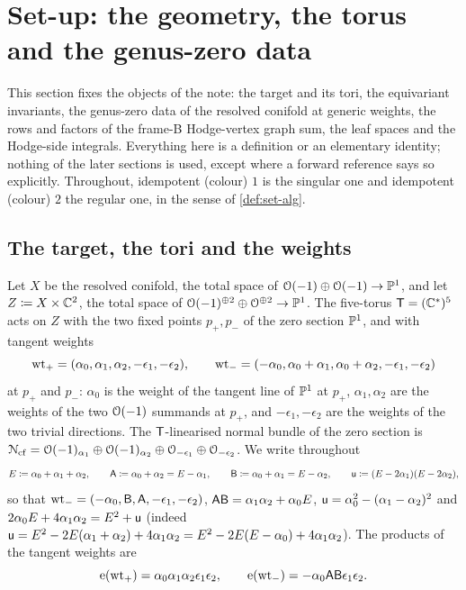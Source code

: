 \providecommand{\pc}{\mathsf{p}}            %
\section{Set-up: the geometry, the torus and the genus-zero data}
\label{sec:set}

This section fixes the objects of the note: the target and its tori, the equivariant invariants, the genus-zero data of the resolved conifold at generic weights, the rows and factors of the frame-B Hodge-vertex graph sum, the leaf spaces and the Hodge-side integrals. Everything here is a definition or an elementary identity; nothing of the later sections is used, except where a forward reference says so explicitly. Throughout, idempotent (colour) $1$ is the singular one and idempotent (colour) $2$ the regular one, in the sense of \cref{def:set-alg}.

\subsection{The target, the tori and the weights}
\label{sec:set-target}

Let $X$ be the resolved conifold, the total space of $\mathcal{O}(-1)\oplus\mathcal{O}(-1)\to\mathbb{P}^1$, and let $Z\coloneqq X\times\mathbb{C}^2$, the total space of $\mathcal{O}(-1)^{\oplus2}\oplus\mathcal{O}^{\oplus2}\to\mathbb{P}^1$. The five-torus $\mathsf{T}=(\mathbb{C}^*)^5$ acts on $Z$ with the two fixed points $p_+,p_-$ of the zero section $\mathbb{P}^1$, and with tangent weights
\begin{equation}
\label{eq:set-wts}
\mathrm{wt}_+=(\alpha_0,\alpha_1,\alpha_2,-\epsilon_1,-\epsilon_2),\qquad
\mathrm{wt}_-=(-\alpha_0,\alpha_0+\alpha_1,\alpha_0+\alpha_2,-\epsilon_1,-\epsilon_2)
\end{equation}
at $p_+$ and $p_-$: $\alpha_0$ is the weight of the tangent line of $\mathbb{P}^1$ at $p_+$, $\alpha_1,\alpha_2$ are the weights of the two $\mathcal{O}(-1)$ summands at $p_+$, and $-\epsilon_1,-\epsilon_2$ are the weights of the two trivial directions. The $\mathsf{T}$-linearised normal bundle of the zero section is $\mathcal{N}_{\mathrm{cf}}=\mathcal{O}(-1)_{\alpha_1}\oplus\mathcal{O}(-1)_{\alpha_2}\oplus\mathcal{O}_{-\epsilon_1}\oplus\mathcal{O}_{-\epsilon_2}$.  We write throughout
\[
E\coloneqq\alpha_0+\alpha_1+\alpha_2,\qquad \mathsf{A}\coloneqq\alpha_0+\alpha_2=E-\alpha_1,\qquad \mathsf{B}\coloneqq\alpha_0+\alpha_1=E-\alpha_2,\qquad \mathsf{u}\coloneqq(E-2\alpha_1)(E-2\alpha_2),
\]
so that $\mathrm{wt}_-=(-\alpha_0,\mathsf{B},\mathsf{A},-\epsilon_1,-\epsilon_2)$, $\mathsf{A}\mathsf{B}=\alpha_1\alpha_2+\alpha_0E$, $\mathsf{u}=\alpha_0^2-(\alpha_1-\alpha_2)^2$ and $2\alpha_0E+4\alpha_1\alpha_2=E^2+\mathsf{u}$ (indeed $\mathsf{u}=E^2-2E(\alpha_1+\alpha_2)+4\alpha_1\alpha_2=E^2-2E(E-\alpha_0)+4\alpha_1\alpha_2$). The products of the tangent weights are
\[
\mathrm{e}(\mathrm{wt}_+)=\alpha_0\alpha_1\alpha_2\epsilon_1\epsilon_2,\qquad \mathrm{e}(\mathrm{wt}_-)=-\alpha_0\mathsf{A}\mathsf{B}\epsilon_1\epsilon_2 .
\]


